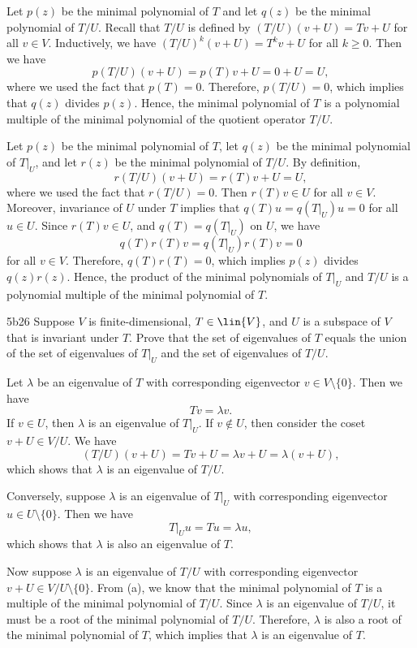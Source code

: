 \begin{solenum}
    \item Let $p(z)$ be the minimal polynomial of $T$ and let $q(z)$ be the minimal polynomial of $T / U$.
    Recall that $T / U$ is defined by $(T / U)(v + U) = Tv + U$ for all $v \in V$.
    Inductively, we have $(T / U)^k(v + U) = T^k v + U$ for all $k \geq 0$.
    Then we have
    \[
    	p(T / U)(v + U) = p(T)v + U = 0 + U = U,
    \]
    where we used the fact that $p(T) = 0$.
    Therefore, $p(T / U) = 0$, which implies that $q(z)$ divides $p(z)$.
    Hence, the minimal polynomial of $T$ is a polynomial multiple of the minimal polynomial of the quotient operator $T / U$.
    \item Let $p(z)$ be the minimal polynomial of $T$, let $q(z)$ be the minimal polynomial of $T|_U$, and let $r(z)$ be the minimal polynomial of $T / U$.
    By definition,
    \[
    	r(T / U)(v + U) = r(T)v + U = U,
    \]
    where we used the fact that $r(T / U) = 0$.
    Then $r(T)v \in U$ for all $v \in V$.
    Moreover, invariance of $U$ under $T$ implies that $q(T)u = q(T|_U)u = 0$ for all $u \in U$.
    Since $r(T)v \in U$, and $q(T) = q(T|_U)$ on $U$, we have
    \[
    	q(T)r(T)v = q(T|_U)r(T)v = 0
    \]
    for all $v \in V$.
    Therefore, $q(T)r(T) = 0$, which implies $p(z)$ divides $q(z)r(z)$.
    Hence, the product of the minimal polynomials of $T|_U$ and $T / U$ is a polynomial multiple of the minimal polynomial of $T$.
\end{solenum}

\begin{exercise}{5b26}
    Suppose $V$ is finite-dimensional, $T \in \lin{V}$, and $U$ is a subspace of $V$ that is invariant under $T$.
	Prove that the set of eigenvalues of $T$ equals the union of the set of eigenvalues of $T|_U$ and the set of eigenvalues of $T / U$.
\end{exercise}

\begin{sol}
    Let $\lambda$ be an eigenvalue of $T$ with corresponding eigenvector $v \in V \setminus \{0\}$.
    Then we have
    \[
    	Tv = \lambda v.
    \]
    If $v \in U$, then $\lambda$ is an eigenvalue of $T|_U$.
    If $v \notin U$, then consider the coset $v + U \in V / U$.
    We have
    \[
    	(T / U)(v + U) = Tv + U = \lambda v + U = \lambda (v + U),
    \]
    which shows that $\lambda$ is an eigenvalue of $T / U$.

    Conversely, suppose $\lambda$ is an eigenvalue of $T|_U$ with corresponding eigenvector $u \in U \setminus \{0\}$.
    Then we have
    \[
    	T|_U u = Tu = \lambda u,
    \]
    which shows that $\lambda$ is also an eigenvalue of $T$.

    Now suppose $\lambda$ is an eigenvalue of $T / U$ with corresponding eigenvector $v + U \in V / U \setminus \{0\}$.
    From  (a), we know that the minimal polynomial of $T$ is a multiple of the minimal polynomial of $T / U$.
    Since $\lambda$ is an eigenvalue of $T / U$, it must be a root of the minimal polynomial of $T / U$.
    Therefore, $\lambda$ is also a root of the minimal polynomial of $T$, which implies that $\lambda$ is an eigenvalue of $T$.
\end{sol}

